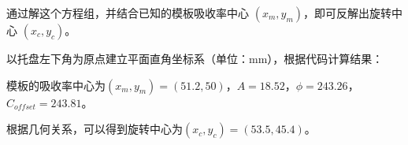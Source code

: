 通过解这个方程组，并结合已知的模板吸收率中心 $(x_m,y_m)$，即可反解出旋转中心 $(x_c,y_c)$。\par

以托盘左下角为原点建立平面直角坐标系（单位：mm），根据代码计算结果：\par
模板的吸收率中心为$(x_m,y_m)=(51.2,50)$，$A=18.52$，$\phi=243.26$，$C_{offset}=243.81$。\par
根据几何关系，可以得到旋转中心为$(x_c,y_c)=(53.5,45.4)$。









